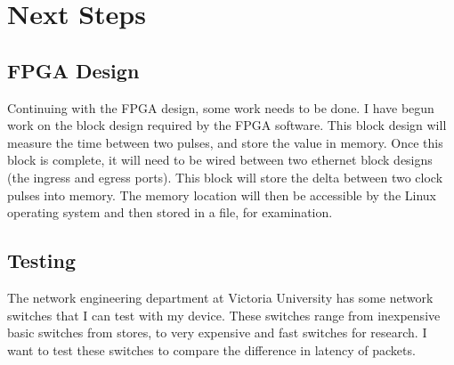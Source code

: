 \chapter{Next Steps}\label{C:nextSteps}

\section{FPGA Design}

Continuing with the FPGA design, some work needs to be done.
I have begun work on the block design required by the FPGA software.
This block design will measure the time between two pulses, and store the value in memory.
Once this block is complete, it will need to be wired between two ethernet block designs (the ingress and egress ports).
This block will store the delta between two clock pulses into memory.
The memory location will then be accessible by the Linux operating system and then stored in a file, for examination.

\section{Testing}

The network engineering department at Victoria University has some network switches that I can test with my device.
These switches range from inexpensive basic switches from stores, to very expensive and fast switches for research.
I want to test these switches to compare the difference in latency of packets.
